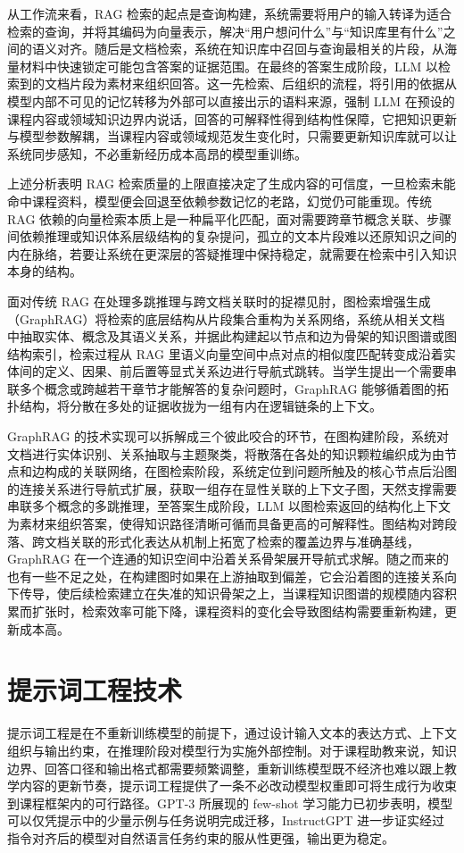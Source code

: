 从工作流来看，RAG 检索的起点是查询构建，系统需要将用户的输入转译为适合检索的查询，并将其编码为向量表示，解决“用户想问什么”与“知识库里有什么”之间的语义对齐。随后是文档检索，系统在知识库中召回与查询最相关的片段，从海量材料中快速锁定可能包含答案的证据范围\cite{ru2024ragchecker}。在最终的答案生成阶段，LLM 以检索到的文档片段为素材来组织回答。这一先检索、后组织的流程，将引用的依据从模型内部不可见的记忆转移为外部可以直接出示的语料来源，强制 LLM 在预设的课程内容或领域知识边界内说话，回答的可解释性得到结构性保障，它把知识更新与模型参数解耦，当课程内容或领域规范发生变化时，只需要更新知识库就可以让系统同步感知，不必重新经历成本高昂的模型重训练\cite{pan2023large}。

上述分析表明 RAG 检索质量的上限直接决定了生成内容的可信度，一旦检索未能命中课程资料，模型便会回退至依赖参数记忆的老路，幻觉仍可能重现\cite{he2024g}。传统 RAG 依赖的向量检索本质上是一种扁平化匹配，面对需要跨章节概念关联、步骤间依赖推理或知识体系层级结构的复杂提问，孤立的文本片段难以还原知识之间的内在脉络，若要让系统在更深层的答疑推理中保持稳定，就需要在检索中引入知识本身的结构。

面对传统 RAG 在处理多跳推理与跨文档关联时的捉襟见肘，图检索增强生成（GraphRAG）将检索的底层结构从片段集合重构为关系网络，系统从相关文档中抽取实体、概念及其语义关系，并据此构建起以节点和边为骨架的知识图谱或图结构索引\cite{edge2024local}，检索过程从 RAG 里语义向量空间中点对点的相似度匹配转变成沿着实体间的定义、因果、前后置等显式关系边进行导航式跳转。当学生提出一个需要串联多个概念或跨越若干章节才能解答的复杂问题时，GraphRAG 能够循着图的拓扑结构，将分散在多处的证据收拢为一组有内在逻辑链条的上下文\cite{he2024g}。

GraphRAG 的技术实现可以拆解成三个彼此咬合的环节，在图构建阶段，系统对文档进行实体识别、关系抽取与主题聚类，将散落在各处的知识颗粒编织成为由节点和边构成的关联网络，在图检索阶段，系统定位到问题所触及的核心节点后沿图的连接关系进行导航式扩展，获取一组存在显性关联的上下文子图，天然支撑需要串联多个概念的多跳推理，至答案生成阶段，LLM 以图检索返回的结构化上下文为素材来组织答案，使得知识路径清晰可循而具备更高的可解释性。图结构对跨段落、跨文档关联的形式化表达从机制上拓宽了检索的覆盖边界与准确基线，GraphRAG 在一个连通的知识空间中沿着关系骨架展开导航式求解\cite{pan2024integrating}。随之而来的也有一些不足之处，在构建图时如果在上游抽取到偏差，它会沿着图的连接关系向下传导，使后续检索建立在失准的知识骨架之上，当课程知识图谱的规模随内容积累而扩张时，检索效率可能下降，课程资料的变化会导致图结构需要重新构建，更新成本高。

\section{提示词工程技术}
提示词工程是在不重新训练模型的前提下，通过设计输入文本的表达方式、上下文组织与输出约束，在推理阶段对模型行为实施外部控制。对于课程助教来说，知识边界、回答口径和输出格式都需要频繁调整，重新训练模型既不经济也难以跟上教学内容的更新节奏，提示词工程提供了一条不必改动模型权重即可将生成行为收束到课程框架内的可行路径。GPT-3 所展现的 few-shot 学习能力已初步表明，模型可以仅凭提示中的少量示例与任务说明完成迁移\cite{brown2020language}，InstructGPT 进一步证实经过指令对齐后的模型对自然语言任务约束的服从性更强，输出更为稳定\cite{ouyang2022training}。

